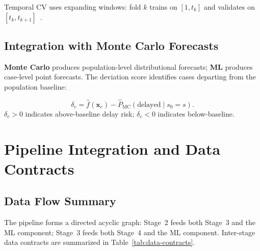 Temporal CV uses expanding windows: fold $k$ trains on $[1, t_k]$ and
validates on $[t_k, t_{k+1}]$~\cite{tashman2000out, hyndman2021forecasting}.


\subsection{Integration with Monte Carlo Forecasts}
\label{sec:ml-integration}

\textbf{Monte Carlo} produces population-level distributional forecasts;
\textbf{ML} produces case-level point forecasts. The deviation score
identifies cases departing from the population baseline:

\begin{definition}
\label{def:deviation}
\begin{equation}
\label{eq:deviation}
\delta_c = \hat{f}(\mathbf{x}_c) - \hat{P}_{\text{MC}}(\text{delayed} \mid s_0 = s).
\end{equation}
$\delta_c > 0$ indicates above-baseline delay risk;
$\delta_c < 0$ indicates below-baseline.
\end{definition}


\section{Pipeline Integration and Data Contracts}
\label{sec:integration}

\subsection{Data Flow Summary}
\label{sec:data-flow}

The pipeline forms a directed acyclic graph: Stage~2 feeds both Stage~3
and the ML component; Stage~3 feeds both Stage~4 and the ML component.
Inter-stage data contracts are summarized in
Table~\ref{tab:data-contracts}.

